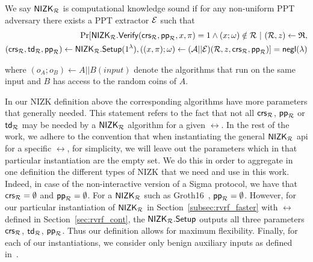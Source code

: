 \begin{definition}\label{def:nizk_knowledge_sound}
	We say ${\mathsf{NIZK}}_\mathcal{R}$ is {computational knowledge sound}  if %
	for any non-uniform PPT adversary \adv there exists a PPT extractor $ \mathcal{E} $
	such that
	\begin{align}
		\Pr[{\mathsf{NIZK}}_\mathcal{R}.{\mathsf{Verify}}(\mathsf{crs}_\mathcal{R}, \mathsf{pp}_\mathcal{R}, x,\pi) = 1 \wedge  (x;\omega) \notin \mathcal{R} \ | \ (\mathcal{R},z) \leftarrow \mathfrak{R}, \\  
		(\mathsf{crs}_\mathcal{R},\mathsf{td}_\mathcal{R},  \mathsf{pp}_\mathcal{R}) \leftarrow {\ensuremath{\mathsf{NIZK}}}_\mathcal{R}.{\mathsf{Setup}}(1^{\lambda}),\nonumber ((x,\pi);\omega)\leftarrow (\mathcal{A}||\mathcal{E})(\mathcal{R}, z, \mathsf{crs}_\mathcal{R},  \mathsf{pp}_\mathcal{R})] =  \mathsf{negl}(\lambda) \nonumber
	\end{align}
	
	\noindent where $ (o_A;o_B)\leftarrow A||B(input) $ denote the algorithms that run on the same input and $ B $ has access to the random coins of $ A $.
\end{definition}

\noindent In our NIZK definition above the corresponding algorithms have more parameters that generally needed. 
This statement refers to the fact that not all $\mathsf{crs}_\mathcal{R}$, $\mathsf{pp}_\mathcal{R}$ or $\mathsf{td}_\mathcal{R}$ may be needed by a ${\mathsf{NIZK}}_\mathcal{R}$ algorithm for a given $\rel$. 
In the rest of the work, we adhere to the convention that when instantiating the general ${\mathsf{NIZK}}_\mathcal{R}$ api for a specific $\rel$, for simplicity, 
we will leave out the parameters which in that particular instantiation are the empty set. We do this in order to aggregate in one definition 
the different types of NIZK that we need and use in this work. Indeed, in case of the non-interactive version of a Sigma protocol, we have 
that $\mathsf{crs}_\mathcal{R} = \emptyset$ and $\mathsf{pp}_\mathcal{R} = \emptyset$. For a ${\mathsf{NIZK}}_\mathcal{R}$ such as Groth16~\cite{Groth16}, $\mathsf{pp}_\mathcal{R}  = \emptyset$. 
However, for our particular instantiation of ${\mathsf{NIZK}}_\mathcal{R}$ in Section~\ref{subsec:rvrf_faster} with $\rel$ defined in Section~\ref{sec:rvrf_cont}, the ${\mathsf{NIZK}}_\mathcal{R}.{\mathsf{Setup}}$ outputs 
all three parameters $\mathsf{crs}_\mathcal{R}$, $\mathsf{td}_\mathcal{R}$, $\mathsf{pp}_\mathcal{R}$. Thus our definition allows for maximum flexibility. Finally, for each of our instantiations, we consider only benign 
auxiliary inputs as defined in~\cite{bening_auxiliary}. 



